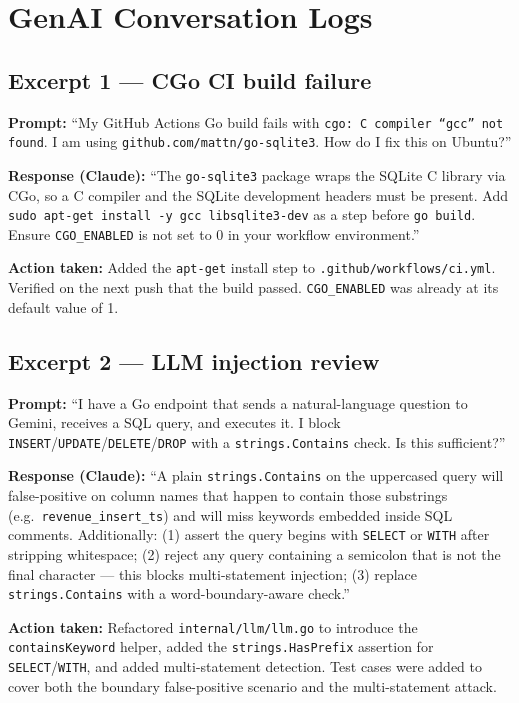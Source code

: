\documentclass[8pt,a4paper]{article}
\begin{document}
\section{GenAI Conversation Logs}
\subsection*{Excerpt 1 — CGo CI build failure}
\textbf{Prompt:} ``My GitHub Actions Go build fails with \texttt{cgo: C compiler ``gcc'' not found}. I am using \texttt{github.com/mattn/go-sqlite3}. How do I fix this on Ubuntu?''

\textbf{Response (Claude):} ``The \texttt{go-sqlite3} package wraps the SQLite C library via CGo, so a C compiler and the SQLite development headers must be present. Add \texttt{sudo apt-get install -y gcc libsqlite3-dev} as a step before \texttt{go build}. Ensure \texttt{CGO\_ENABLED} is not set to 0 in your workflow environment.''

\textbf{Action taken:} Added the \texttt{apt-get} install step to \texttt{.github/workflows/ci.yml}. Verified on the next push that the build passed. \texttt{CGO\_ENABLED} was already at its default value of 1.

\subsection*{Excerpt 2 — LLM injection review}
\textbf{Prompt:} ``I have a Go endpoint that sends a natural-language question to Gemini, receives a SQL query, and executes it. I block \texttt{INSERT}/\texttt{UPDATE}/\texttt{DELETE}/\texttt{DROP} with a \texttt{strings.Contains} check. Is this sufficient?''

\textbf{Response (Claude):} ``A plain \texttt{strings.Contains} on the uppercased query will false-positive on column names that happen to contain those substrings (e.g.\ \texttt{revenue\_insert\_ts}) and will miss keywords embedded inside SQL comments. Additionally: (1) assert the query begins with \texttt{SELECT} or \texttt{WITH} after stripping whitespace; (2) reject any query containing a semicolon that is not the final character — this blocks multi-statement injection; (3) replace \texttt{strings.Contains} with a word-boundary-aware check.''

\textbf{Action taken:} Refactored \texttt{internal/llm/llm.go} to introduce the \texttt{containsKeyword} helper, added the \texttt{strings.HasPrefix} assertion for \texttt{SELECT}/\texttt{WITH}, and added multi-statement detection. Test cases were added to cover both the boundary false-positive scenario and the multi-statement attack.
\end{document}
